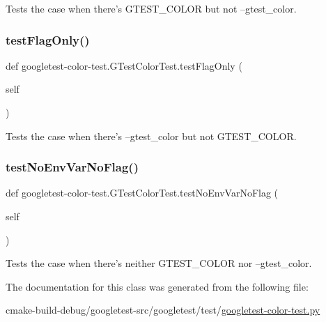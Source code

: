 \begin{DoxyVerb}Tests the case when there's GTEST_COLOR but not --gtest_color.\end{DoxyVerb}
 \mbox{\label{classgoogletest-color-test_1_1GTestColorTest_ade41e99b5486c9d947d9b817210174f6}} 
\subsubsection{\texorpdfstring{testFlagOnly()}{testFlagOnly()}}
{\footnotesize\ttfamily def googletest-\/color-\/test.\+G\+Test\+Color\+Test.\+test\+Flag\+Only (\begin{DoxyParamCaption}\item[{}]{self }\end{DoxyParamCaption})}

\begin{DoxyVerb}Tests the case when there's --gtest_color but not GTEST_COLOR.\end{DoxyVerb}
 \mbox{\label{classgoogletest-color-test_1_1GTestColorTest_ae36014618c6afc19fa6d77babf8faa88}} 
\subsubsection{\texorpdfstring{testNoEnvVarNoFlag()}{testNoEnvVarNoFlag()}}
{\footnotesize\ttfamily def googletest-\/color-\/test.\+G\+Test\+Color\+Test.\+test\+No\+Env\+Var\+No\+Flag (\begin{DoxyParamCaption}\item[{}]{self }\end{DoxyParamCaption})}

\begin{DoxyVerb}Tests the case when there's neither GTEST_COLOR nor --gtest_color.\end{DoxyVerb}
 

The documentation for this class was generated from the following file\+:\begin{DoxyCompactItemize}
\item 
cmake-\/build-\/debug/googletest-\/src/googletest/test/\mbox{\hyperlink{googletest-color-test_8py}{googletest-\/color-\/test.\+py}}\end{DoxyCompactItemize}
